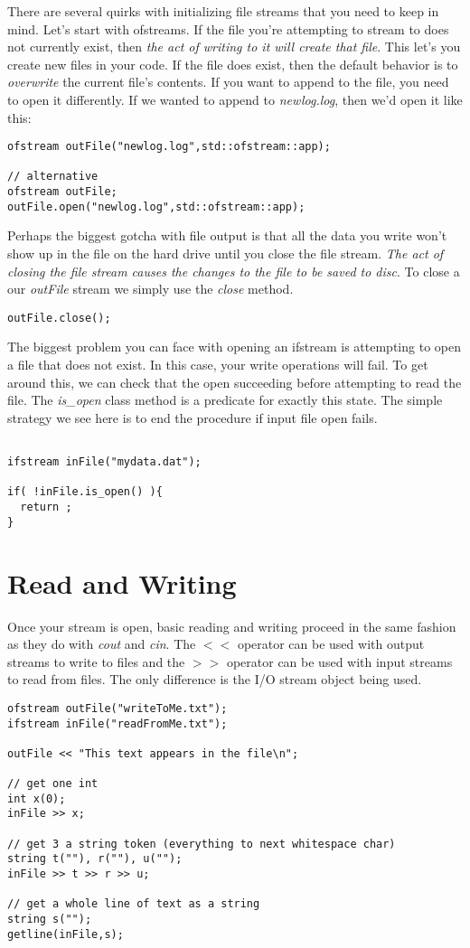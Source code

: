 \documentclass[]{tufte-handout}
\begin{document}
There are several quirks with initializing file streams that you need to keep in mind.  Let's start with ofstreams.  If the file you're attempting to stream to does not currently exist, then \textit{the act of writing to it will create that file}.  This let's you create new files in your code. If the file does exist, then the default behavior is to \textit{overwrite} the current file's contents.  If you want to append to the file, you need to open it differently. If we wanted to append to \textit{newlog.log}, then we'd open it like this:
\begin{verbatim}
ofstream outFile("newlog.log",std::ofstream::app); 

// alternative 
ofstream outFile;
outFile.open("newlog.log",std::ofstream::app);
\end{verbatim}
Perhaps the biggest gotcha with file output is that all the data you write won't show up in the file on the hard drive until you close the file stream. \textit{The act of closing the file stream causes the changes to the file to be saved to disc}.  To close a our \textit{outFile} stream we simply use the \textit{close} method.
\begin{verbatim}
outFile.close();
\end{verbatim}

The biggest problem you can face with opening an ifstream is attempting to open a file that does not exist.  In this case, your write operations will fail. To get around this, we can check that the open succeeding before attempting to read the file. The \textit{is\_open} class method is a predicate for exactly this state.  The simple strategy we see here is to end the procedure if input file open fails.
\begin{verbatim}

ifstream inFile("mydata.dat");

if( !inFile.is_open() ){
  return ; 
}
\end{verbatim}

\section{Read and Writing}

Once your stream is open, basic reading and writing proceed in the same fashion as they do with \textit{cout} and \textit{cin}.  The $<<$ operator can be used with output streams to write to files and the $>>$ operator can be used with input streams to read from files. The only difference is the I/O stream object being used.
\begin{verbatim}
ofstream outFile("writeToMe.txt");
ifstream inFile("readFromMe.txt");

outFile << "This text appears in the file\n";

// get one int
int x(0);
inFile >> x;

// get 3 a string token (everything to next whitespace char)
string t(""), r(""), u("");
inFile >> t >> r >> u;

// get a whole line of text as a string
string s("");
getline(inFile,s);
\end{verbatim}
\end{document}
